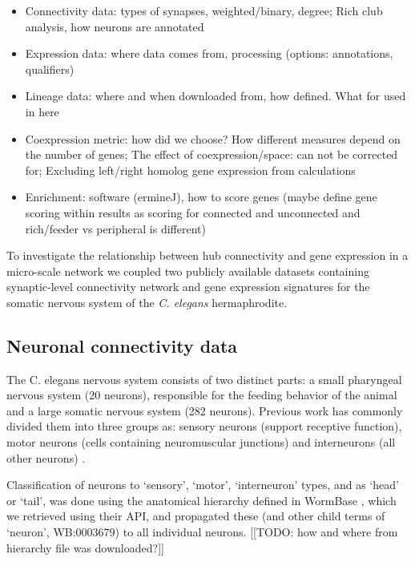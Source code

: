 \documentclass[10pt,letterpaper]{article}
\begin{document}
\begin{itemize}
    \item{Connectivity data: types of synapses, weighted/binary, degree; Rich club analysis, how neurons are annotated}
    \item{Expression data: where data comes from, processing (options: annotations, qualifiers)}
    \item{Lineage data: where and when downloaded from, how defined. What for used in here}
    \item{Coexpression metric: how did we choose? How different measures depend on the number of genes; The effect of coexpression/space: can not be corrected for; Excluding left/right homolog gene expression from calculations}
    \item{Enrichment: software (ermineJ), how to score genes (maybe define gene scoring within results as scoring for connected and unconnected and rich/feeder vs peripheral is different)}
\end{itemize}

To investigate the relationship between hub connectivity and gene expression in a micro-scale network we coupled two publicly available datasets containing synaptic-level connectivity network and gene expression signatures for the somatic nervous system of the \textit{C. elegans} hermaphrodite.

\subsection*{Neuronal connectivity data}

The C. elegans nervous system consists of two distinct parts: a small pharyngeal nervous system (20 neurons), responsible for  the feeding behavior of the animal and a large somatic nervous system (282 neurons).
Previous work has commonly divided them into three groups as:
sensory neurons (support receptive function),
motor neurons (cells containing neuromuscular junctions) and
interneurons (all other neurons) \cite{White:1986tx}.

Classification of neurons to `sensory', `motor', `interneuron' types, and as `head' or `tail', was done using the anatomical hierarchy defined in WormBase \cite{Harris:2009kd}, which we retrieved using their API, and propagated these (and other child terms of `neuron', WB:0003679) to all individual neurons. [[TODO: how and where from hierarchy file was downloaded?]]%
\end{document}
